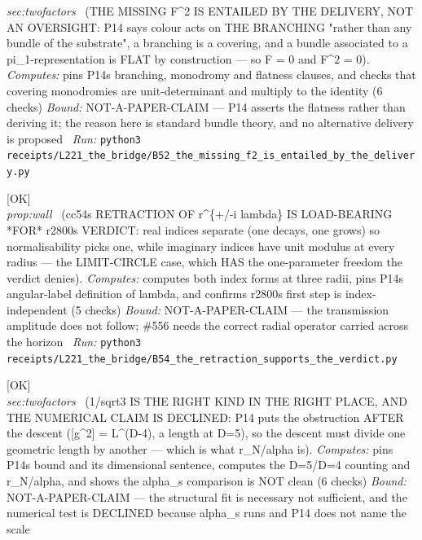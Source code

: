 \begin{description}
\textit{sec:twofactors} \ (THE MISSING F\textasciicircum{}2 IS ENTAILED BY THE DELIVERY, NOT AN OVERSIGHT: P14 says colour acts on THE BRANCHING "rather than any bundle of the substrate", a branching is a covering, and a bundle associated to a pi\_1-representation is FLAT by construction --- so F = 0 and F\textasciicircum{}2 = 0). 
\emph{Computes:} pins P14s branching, monodromy and flatness clauses, and checks that covering monodromies are unit-determinant and multiply to the identity (6 checks)
 \emph{Bound:} NOT-A-PAPER-CLAIM --- P14 asserts the flatness rather than deriving it; the reason here is standard bundle theory, and no alternative delivery is proposed
\ \emph{Run:} \texttt{python3 receipts/L221\_the\_bridge/B52\_the\_missing\_f2\_is\_entailed\_by\_the\_delivery.py}
\item[\label{rcpt:B54_the_retraction_supports_the_verdict}\textbf{}\quad\texttt{B54\_the\_retraction\_supports\_the\_verdict}]\hfill\textsf{[OK]}\\
\textit{prop:wall} \ (cc54s RETRACTION OF r\textasciicircum{}\{+/-i lambda\} IS LOAD-BEARING *FOR* r2800s VERDICT: real indices separate (one decays, one grows) so normalisability picks one, while imaginary indices have unit modulus at every radius --- the LIMIT-CIRCLE case, which HAS the one-parameter freedom the verdict denies). 
\emph{Computes:} computes both index forms at three radii, pins P14s angular-label definition of lambda, and confirms r2800s first step is index-independent (5 checks)
 \emph{Bound:} NOT-A-PAPER-CLAIM --- the transmission amplitude does not follow; \#556 needs the correct radial operator carried across the horizon
\ \emph{Run:} \texttt{python3 receipts/L221\_the\_bridge/B54\_the\_retraction\_supports\_the\_verdict.py}
\item[\label{rcpt:B55_right_kind_right_place_numerical_declined}\textbf{}\quad\texttt{B55\_right\_kind\_right\_place\_numerical\_declined}]\hfill\textsf{[OK]}\\
\textit{sec:twofactors} \ (1/sqrt3 IS THE RIGHT KIND IN THE RIGHT PLACE, AND THE NUMERICAL CLAIM IS DECLINED: P14 puts the obstruction AFTER the descent ([g\textasciicircum{}2] = L\textasciicircum{}(D-4), a length at D=5), so the descent must divide one geometric length by another --- which is what r\_N/alpha is). 
\emph{Computes:} pins P14s bound and its dimensional sentence, computes the D=5/D=4 counting and r\_N/alpha, and shows the alpha\_s comparison is NOT clean (6 checks)
 \emph{Bound:} NOT-A-PAPER-CLAIM --- the structural fit is necessary not sufficient, and the numerical test is DECLINED because alpha\_s runs and P14 does not name the scale

\end{description}
